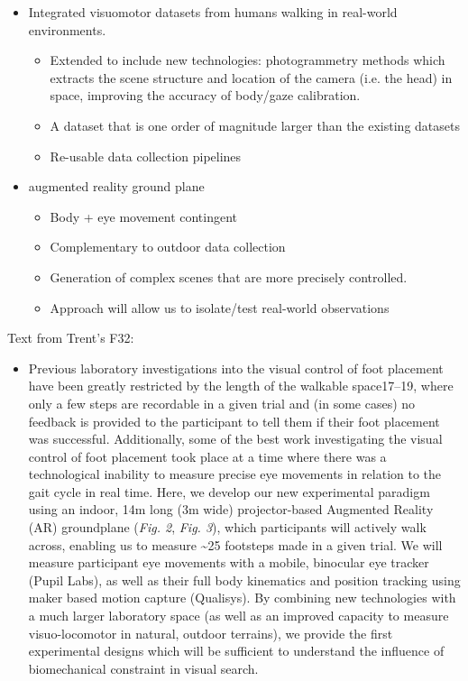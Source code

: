 \begin{itemize}


\item
  Integrated visuomotor datasets from humans walking in real-world
  environments.

  \begin{itemize}
  \item
    Extended to include new technologies: photogrammetry methods which
    extracts the scene structure and location of the camera (i.e. the
    head) in space, improving the accuracy of body/gaze calibration.
  \item
    A dataset that is one order of magnitude larger than the existing
    datasets
  \item
    Re-usable data collection pipelines
  \end{itemize}
\item
  augmented reality ground plane

  \begin{itemize}
  \item
    Body + eye movement contingent
  \item
    Complementary to outdoor data collection
  \item
    Generation of complex scenes that are more precisely controlled.
  \item
    Approach will allow us to isolate/test real-world observations
  \end{itemize}
\end{itemize}

Text from Trent's F32:

\begin{itemize}
\item
  Previous laboratory investigations into the visual control of foot
  placement have been greatly restricted by the length of the walkable
  space17--19, where only a few steps are recordable in a given trial
  and (in some cases) no feedback is provided to the participant to tell
  them if their foot placement was successful. Additionally, some of the
  best work investigating the visual control of foot placement took
  place at a time where there was a technological inability to measure
  precise eye movements in relation to the gait cycle in real time.
  Here, we develop our new experimental paradigm using an indoor, 14m
  long (3m wide) projector-based Augmented Reality (AR) groundplane
  (\emph{Fig. 2}, \emph{Fig. 3}), which participants will actively walk
  across, enabling us to measure \textasciitilde25 footsteps made in a
  given trial. We will measure participant eye movements with a mobile,
  binocular eye tracker (Pupil Labs), as well as their full body
  kinematics and position tracking using maker based motion capture
  (Qualisys). By combining new technologies with a much larger
  laboratory space (as well as an improved capacity to measure
  visuo-locomotor in natural, outdoor terrains), we provide the first
  experimental designs which will be sufficient to understand the
  influence of biomechanical constraint in visual search.
\end{itemize}
